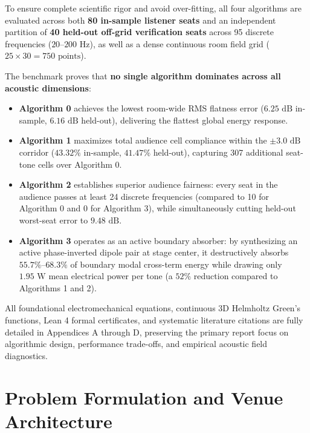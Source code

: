 \documentclass[11pt,a4paper,titlepage]{article}
\begin{document}
To ensure complete scientific rigor and avoid over-fitting, all four algorithms are evaluated across both \textbf{80 in-sample listener seats} and an independent partition of \textbf{40 held-out off-grid verification seats} across 95 discrete frequencies ($20\text{--}200\text{ Hz}$), as well as a dense continuous room field grid ($25 \times 30 = 750\text{ points}$). 

The benchmark proves that \textbf{no single algorithm dominates across all acoustic dimensions}:
\begin{itemize}
    \item \textbf{Algorithm 0} achieves the lowest room-wide RMS flatness error ($6.25\text{ dB}$ in-sample, $6.16\text{ dB}$ held-out), delivering the flattest global energy response.
    \item \textbf{Algorithm 1} maximizes total audience cell compliance within the $\pm 3.0\text{ dB}$ corridor ($43.32\%$ in-sample, $41.47\%$ held-out), capturing 307 additional seat-tone cells over Algorithm 0.
    \item \textbf{Algorithm 2} establishes superior audience fairness: every seat in the audience passes at least 24 discrete frequencies (compared to 10 for Algorithm 0 and 0 for Algorithm 3), while simultaneously cutting held-out worst-seat error to $9.48\text{ dB}$.
    \item \textbf{Algorithm 3} operates as an active boundary absorber: by synthesizing an active phase-inverted dipole pair at stage center, it destructively absorbs $55.7\%\text{--}68.3\%$ of boundary modal cross-term energy while drawing only $1.95\text{ W}$ mean electrical power per tone (a $52\%$ reduction compared to Algorithms 1 and 2).
\end{itemize}

All foundational electromechanical equations, continuous 3D Helmholtz Green's functions, Lean 4 formal certificates, and systematic literature citations are fully detailed in Appendices A through D, preserving the primary report focus on algorithmic design, performance trade-offs, and empirical acoustic field diagnostics.

\newpage
{}

\section{Problem Formulation and Venue Architecture}
\end{document}
